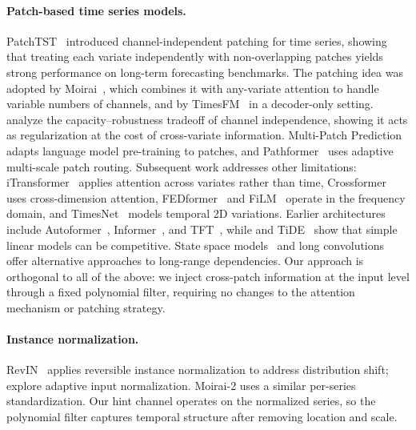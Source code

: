 \documentclass[11pt]{article}
\begin{document}
\paragraph{Patch-based time series models.}
PatchTST~\citep{nie2023patchtst} introduced channel-independent patching for time series, showing that treating each variate independently with non-overlapping patches yields strong performance on long-term forecasting benchmarks. The patching idea was adopted by Moirai~\citep{woo2024unified}, which combines it with any-variate attention to handle variable numbers of channels, and by TimesFM~\citep{das2024decoder} in a decoder-only setting. \citet{han2024capacity} analyze the capacity--robustness tradeoff of channel independence, showing it acts as regularization at the cost of cross-variate information. Multi-Patch Prediction~\citep{chen2024multi} adapts language model pre-training to patches, and Pathformer~\citep{zhang2024crossformer} uses adaptive multi-scale patch routing. Subsequent work addresses other limitations: iTransformer~\citep{liu2024itransformer} applies attention across variates rather than time, Crossformer~\citep{zhang2023crossformer} uses cross-dimension attention, FEDformer~\citep{zhou2022fedformer} and FiLM~\citep{zhou2022film} operate in the frequency domain, and TimesNet~\citep{wu2023timesnet} models temporal 2D variations. Earlier architectures include Autoformer~\citep{wu2021autoformer}, Informer~\citep{zhou2021informer}, and TFT~\citep{lim2021temporal}, while \citet{zeng2023dlinear} and TiDE~\citep{das2024lags} show that simple linear models can be competitive. State space models~\citep{gu2022efficiently,gu2024mamba} and long convolutions~\citep{romero2022ckconv,poli2023hyena} offer alternative approaches to long-range dependencies. Our approach is orthogonal to all of the above: we inject cross-patch information at the input level through a fixed polynomial filter, requiring no changes to the attention mechanism or patching strategy.

\paragraph{Instance normalization.}
RevIN~\citep{kim2022reversible} applies reversible instance normalization to address distribution shift; \citet{passalis2020deep} explore adaptive input normalization. Moirai-2 uses a similar per-series standardization. Our hint channel operates on the normalized series, so the polynomial filter captures temporal structure after removing location and scale.
\end{document}
